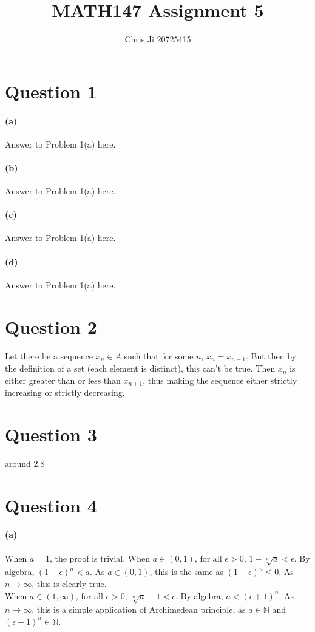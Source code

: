 \documentclass[10pt,letter]{article}
\begin{document}
\title{MATH147 Assignment 5}
\author{Chris Ji 20725415}

\maketitle 

\section*{Question 1}

\paragraph{(a)} Answer to Problem 1(a) here.

\paragraph{(b)} Answer to Problem 1(a) here.
\paragraph{(c)} Answer to Problem 1(a) here.
\paragraph{(d)} Answer to Problem 1(a) here.


\section*{Question 2}
Let there be a sequence $x_n \in A$ such that for some $n$, $x_n = x_{n+1}$. But then by the definition of a set (each element is distinct), this can't be true. Then $x_n$ is either greater than or less than $x_{n+1}$, thus making the sequence either strictly increasing or strictly decreasing. 

\section*{Question 3}
around 2.8

\section*{Question 4}
\paragraph{(a)} When $a = 1$, the proof is trivial. When $a \in (0, 1)$, for all $\epsilon > 0$, $1 - \sqrt[n]{a} < \epsilon$. By algebra, $(1 - \epsilon)^n < a$. As $a \in (0, 1)$, this is the same as $(1 - \epsilon)^n \leq 0$. As $n \rightarrow\infty$, this is clearly true. 
\\When $a \in (1, \infty)$, for all $\epsilon > 0$, $\sqrt[n]{a} - 1 < \epsilon$. By algebra, $a < (\epsilon + 1)^n$. As $n\rightarrow\infty$, this is a simple application of Archimedean principle, as $a \in \mathbb{N}$ and $(\epsilon + 1)^n \in \mathbb{N}$. 
\end{document}
